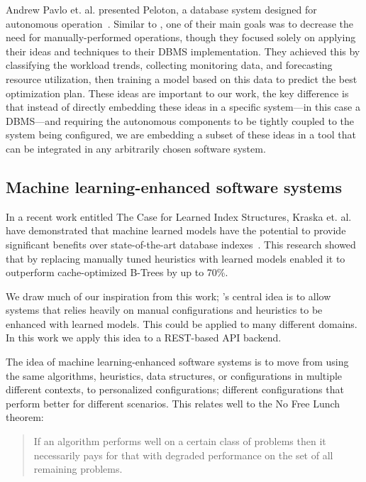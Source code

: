 Andrew Pavlo et. al. presented Peloton, a database system designed for autonomous operation~\cite{andrew_pavlo_self-driving_2017}. Similar to \projectname{}, one of their main goals was to decrease the need for manually-performed operations, though they focused solely on applying their ideas and techniques to their DBMS implementation. They achieved this by classifying the workload trends, collecting monitoring data, and forecasting resource utilization, then training a model based on this data to predict the best optimization plan. These ideas are important to our work, the key difference is that instead of directly embedding these ideas in a specific system---in this case a DBMS---and requiring the autonomous components to be tightly coupled to the system being configured, we are embedding a subset of these ideas in a tool that can be integrated in any arbitrarily chosen software system.

\subsection{Machine learning-enhanced software systems}

In a recent work entitled The Case for Learned Index Structures, Kraska et. al. have demonstrated that machine learned models have the potential to provide significant benefits over state-of-the-art database indexes~\cite{kraska_case_2017}. This research showed that by replacing manually tuned heuristics with learned models enabled it to outperform cache-optimized B-Trees by up to 70\%.

We draw much of our inspiration from this work; \projectname{}'s central idea is to allow systems that relies heavily on manual configurations and heuristics to be enhanced with learned models. This could be applied to many different domains. In this work we apply this idea to a REST-based API backend.

The idea of machine learning-enhanced software systems is to move from using the same algorithms, heuristics, data structures, or configurations in multiple different contexts, to personalized configurations; different configurations that perform better for different scenarios. This relates well to the No Free Lunch theorem:
\begin{quote}
  If an algorithm performs well on a certain class of problems then it necessarily pays for that with degraded performance on the set of all remaining problems.
\end{quote}

